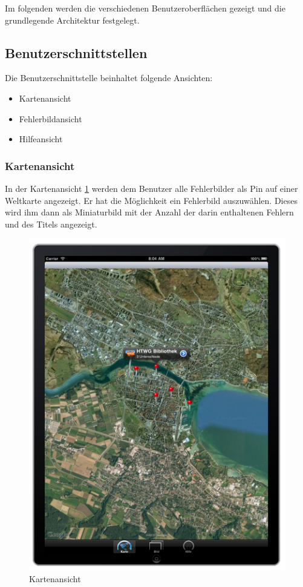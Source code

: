 Im folgenden werden die verschiedenen Benutzeroberflächen gezeigt und die grundlegende Architektur festgelegt.

\subsection{Benutzerschnittstellen}
Die Benutzerschnittstelle beinhaltet folgende Ansichten:
\begin{itemize}
  \item Kartenansicht
  \item Fehlerbildansicht
  \item Hilfeansicht
\end{itemize}

\subsubsection{Kartenansicht}
In der Kartenansicht \ref{mapviewscreen} werden dem Benutzer alle Fehlerbilder
als Pin auf einer Weltkarte angezeigt. Er hat die Möglichkeit ein Fehlerbild auszuwählen. Dieses
wird ihm dann als Miniaturbild mit der Anzahl der darin enthaltenen Fehlern und
des Titels angezeigt.
\begin{figure}[H]
  \centering
  \includegraphics[width=1.0\textwidth]{bilder/screen1.jpg}
  \caption{Kartenansicht}
  \label{mapviewscreen}
\end{figure}

